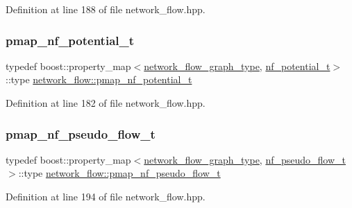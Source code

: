 Definition at line 188 of file network\+\_\+flow.\+hpp.

\mbox{\label{classnetwork__flow_a27c9b52e67a89ed0f6584017fdf365a5}} 
\subsubsection{\texorpdfstring{pmap\+\_\+nf\+\_\+potential\+\_\+t}{pmap\_nf\_potential\_t}}
{\footnotesize\ttfamily typedef boost\+::property\+\_\+map$<$\hyperlink{classnetwork__flow_abfdb8d1baba183c2b121f8c078b9b640}{network\+\_\+flow\+\_\+graph\+\_\+type}, \hyperlink{structnetwork__flow_1_1nf__potential__t}{nf\+\_\+potential\+\_\+t}$>$\+::type \hyperlink{classnetwork__flow_a27c9b52e67a89ed0f6584017fdf365a5}{network\+\_\+flow\+::pmap\+\_\+nf\+\_\+potential\+\_\+t}\hspace{0.3cm}{\ttfamily [private]}}



Definition at line 182 of file network\+\_\+flow.\+hpp.

\mbox{\label{classnetwork__flow_ae2897f4e40c2208d05a1939f4c2f626f}} 
\subsubsection{\texorpdfstring{pmap\+\_\+nf\+\_\+pseudo\+\_\+flow\+\_\+t}{pmap\_nf\_pseudo\_flow\_t}}
{\footnotesize\ttfamily typedef boost\+::property\+\_\+map$<$\hyperlink{classnetwork__flow_abfdb8d1baba183c2b121f8c078b9b640}{network\+\_\+flow\+\_\+graph\+\_\+type}, \hyperlink{structnetwork__flow_1_1nf__pseudo__flow__t}{nf\+\_\+pseudo\+\_\+flow\+\_\+t}$>$\+::type \hyperlink{classnetwork__flow_ae2897f4e40c2208d05a1939f4c2f626f}{network\+\_\+flow\+::pmap\+\_\+nf\+\_\+pseudo\+\_\+flow\+\_\+t}\hspace{0.3cm}{\ttfamily [private]}}



Definition at line 194 of file network\+\_\+flow.\+hpp.

